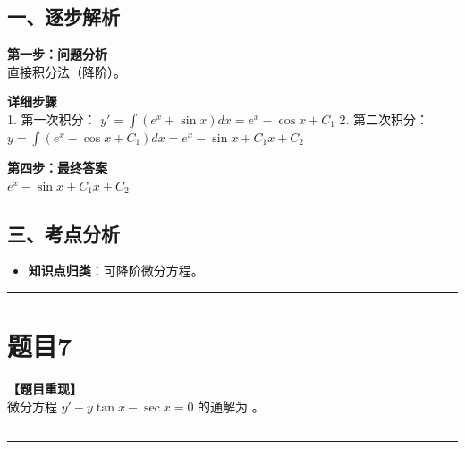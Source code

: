 \documentclass[12pt, a4paper]{ctexart}
\newcommand{\TopSeparator}{
    \par\noindent\rule{\textwidth}{1.5pt}\vspace{0.5em} %
}
\newcommand{\AnalysisSeparator}{
    \par\noindent\rule{\textwidth}{0.5pt}\vspace{0.2em}\hrule\vspace{0.5em} %
}
\newenvironment{RedAnalysis}{
    \par
    \color{red} %
}{
    \par
    \color{black} %
}
\begin{document}
\begin{RedAnalysis}

\subsection*{一、逐步解析}

\textbf{第一步：问题分析} \\
直接积分法（降阶）。

\textbf{详细步骤} \\
1. 第一次积分：
   $y' = \int (e^x + \sin x) dx = e^x - \cos x + C_1$
2. 第二次积分：
   $y = \int (e^x - \cos x + C_1) dx = e^x - \sin x + C_1 x + C_2$

\textbf{第四步：最终答案} \\
$ e^x - \sin x + C_1 x + C_2 $

\subsection*{三、考点分析}
\begin{itemize}
    \item \textbf{知识点归类}：可降阶微分方程。
\end{itemize}

\end{RedAnalysis}

\vspace{2em}

\TopSeparator
\section*{题目7}

\textbf{【题目重现】} \\
微分方程 $ y' - y \tan x - \sec x = 0 $ 的通解为 \underline{\hspace{2cm}}。

\AnalysisSeparator
\end{document}
